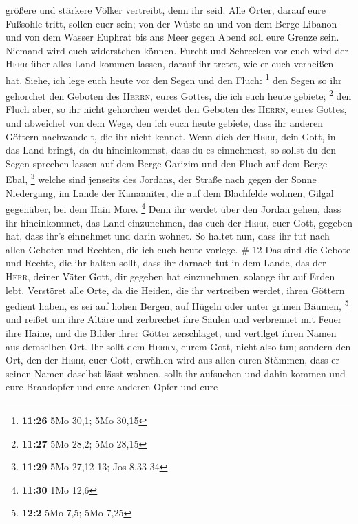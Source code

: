 größere und stärkere Völker vertreibt, denn ihr seid. 
Alle Örter, darauf eure Fußsohle tritt, sollen euer sein; von der Wüste
an und von dem Berge Libanon und von dem Wasser Euphrat bis ans Meer
gegen Abend soll eure Grenze sein.  Niemand wird euch
widerstehen können. Furcht und Schrecken vor euch wird der \textsc{Herr}
über alles Land kommen lassen, darauf ihr tretet, wie er euch verheißen
hat.  Siehe, ich lege euch heute vor den Segen und den
Fluch: \footnote{\textbf{11:26} 5Mo 30,1; 5Mo 30,15}  den
Segen so ihr gehorchet den Geboten des \textsc{Herrn}, eures Gottes, die
ich euch heute gebiete; \footnote{\textbf{11:27} 5Mo 28,2; 5Mo 28,15}
 den Fluch aber, so ihr nicht gehorchen werdet den
Geboten des \textsc{Herrn}, eures Gottes, und abweichet von dem Wege,
den ich euch heute gebiete, dass ihr anderen Göttern nachwandelt, die
ihr nicht kennet.  Wenn dich der \textsc{Herr}, dein
Gott, in das Land bringt, da du hineinkommst, dass du es einnehmest, so
sollst du den Segen sprechen lassen auf dem Berge Garizim und den Fluch
auf dem Berge Ebal, \footnote{\textbf{11:29} 5Mo 27,12-13; Jos 8,33-34}
 welche sind jenseits des Jordans, der Straße nach gegen
der Sonne Niedergang, im Lande der Kanaaniter, die auf dem Blachfelde
wohnen, Gilgal gegenüber, bei dem Hain More. \footnote{\textbf{11:30}
  1Mo 12,6}  Denn ihr werdet über den Jordan gehen, dass
ihr hineinkommet, das Land einzunehmen, das euch der \textsc{Herr}, euer
Gott, gegeben hat, dass ihr's einnehmet und darin wohnet.
 So haltet nun, dass ihr tut nach allen Geboten und
Rechten, die ich euch heute vorlege. \# 12  Das sind die
Gebote und Rechte, die ihr halten sollt, dass ihr darnach tut in dem
Lande, das der \textsc{Herr}, deiner Väter Gott, dir gegeben hat
einzunehmen, solange ihr auf Erden lebt.  Verstöret alle
Orte, da die Heiden, die ihr vertreiben werdet, ihren Göttern gedient
haben, es sei auf hohen Bergen, auf Hügeln oder unter grünen Bäumen,
\footnote{\textbf{12:2} 5Mo 7,5; 5Mo 7,25}  und reißet um
ihre Altäre und zerbrechet ihre Säulen und verbrennet mit Feuer ihre
Haine, und die Bilder ihrer Götter zerschlaget, und vertilget ihren
Namen aus demselben Ort.  Ihr sollt dem \textsc{Herrn},
eurem Gott, nicht also tun;  sondern den Ort, den der
\textsc{Herr}, euer Gott, erwählen wird aus allen euren Stämmen, dass er
seinen Namen daselbst lässt wohnen, sollt ihr aufsuchen und dahin kommen
 und eure Brandopfer und eure anderen Opfer und eure
